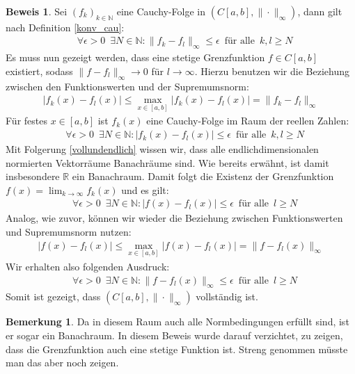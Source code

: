 \documentclass[10pt,a4paper]{article}
\theoremstyle{plain}
\theoremstyle{definition}
\theoremstyle{nonumberplain}
\newtheorem{bemerkung}{Bemerkung}
\newenvironment{bem}{\begin{bemerkung}}{\end{bemerkung}}
\newtheorem{beweis}{Beweis}
\newenvironment{bew}{\begin{beweis}}{\end{beweis}}
\newcommand{\N}{\mathbb{N}}
\newcommand{\R}{\mathbb{R}}
\begin{document}
\begin{bew}
Sei ${(f_k)}_{k \in \N}$ eine Cauchy-Folge in $(C[a,b], \|\cdot\|_\infty)$, dann gilt nach Definition \hyperref[konv_cau]{\ref*{konv_cau}}:
\begin{align*}
& \forall \epsilon > 0 \enspace \exists N \in \N : \|f_k - f_l\|_\infty \leq \epsilon \enspace \text{für alle} \enspace k,l \geq N
\end{align*}
Es muss nun gezeigt werden, dass eine stetige Grenzfunktion $f \in C[a,b]$ existiert, sodass $\|f - f_l\|_\infty \rightarrow 0$ für $l \rightarrow \infty$.
Hierzu benutzen wir die Beziehung zwischen den Funktionswerten und der Supremumsnorm:
\begin{align*}
|f_k(x) - f_l(x)| \leq \max_{x \in [a,b]}{|f_k(x) - f_l(x)|} = \|f_k - f_l\|_\infty
\end{align*}
Für festes $x \in [a,b]$ ist $f_k(x)$ eine Cauchy-Folge im Raum der reellen Zahlen:
\begin{align*}
& \forall \epsilon > 0 \enspace \exists N \in \N : |f_k(x) - f_l(x)| \leq \epsilon \enspace \text{für alle} \enspace k,l \geq N
\end{align*}
Mit Folgerung \hyperref[vollundendlich]{\ref*{vollundendlich}} wissen wir, dass alle endlichdimensionalen normierten Vektorräume Banachräume sind. Wie bereits erwähnt, ist damit insbesondere $\R$ ein Banachraum. Damit folgt die Existenz der Grenzfunktion $f(x) = \lim_{k \to \infty}{f_k(x)}$ und es gilt:
\begin{align*}
& \forall \epsilon > 0 \enspace \exists N \in \N : |f(x) - f_l(x)| \leq \epsilon \enspace \text{für alle} \enspace l \geq N
\end{align*}
Analog, wie zuvor, können wir wieder die Beziehung zwischen Funktionswerten und Supremumsnorm nutzen:
\begin{align*}
 |f(x) - f_l(x)| \leq \max_{x \in [a,b]}{|f(x) - f_l(x)|} = \|f - f_l(x)\|_\infty
\end{align*}
Wir erhalten also folgenden Ausdruck:
\begin{align*}
& \forall \epsilon > 0 \enspace \exists N \in \N : \|f - f_l(x)\|_\infty \leq \epsilon \enspace \text{für alle} \enspace l \geq N
\end{align*}
Somit ist gezeigt, dass $(C[a,b], \|\cdot\|_\infty)$ vollständig ist.
\end{bew}
\begin{bem}
Da in diesem Raum auch alle Normbedingungen erfüllt sind, ist er sogar ein Banachraum. In diesem Beweis wurde darauf verzichtet, zu zeigen, dass die Grenzfunktion auch eine stetige Funktion ist. Streng genommen müsste man das aber noch zeigen.
\end{bem}
\end{document}
